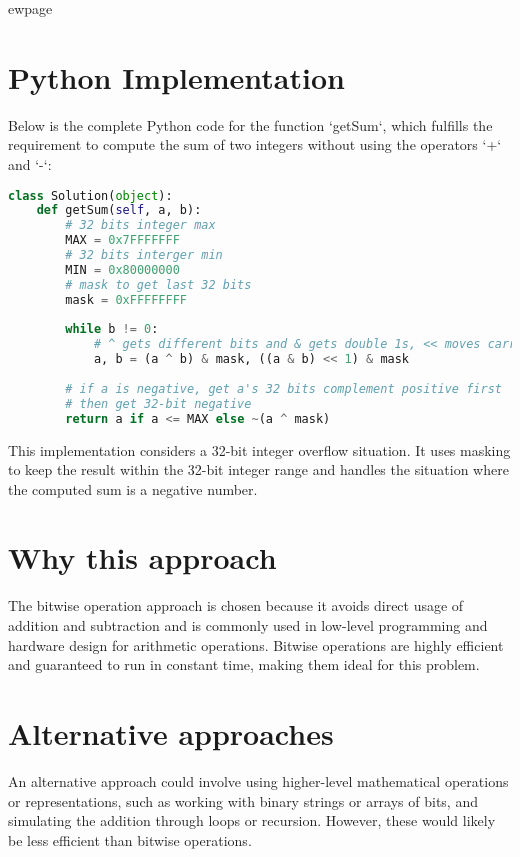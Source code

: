 ewpage %
\section*{Python Implementation}
Below is the complete Python code for the function `getSum`, which fulfills the requirement to compute the sum of two integers without using the operators `+` and `-`:

\begin{fullwidth}
\begin{lstlisting}[language=Python]
class Solution(object):
    def getSum(self, a, b):
        # 32 bits integer max
        MAX = 0x7FFFFFFF
        # 32 bits interger min 
        MIN = 0x80000000
        # mask to get last 32 bits
        mask = 0xFFFFFFFF
        
        while b != 0:
            # ^ gets different bits and & gets double 1s, << moves carry
            a, b = (a ^ b) & mask, ((a & b) << 1) & mask
            
        # if a is negative, get a's 32 bits complement positive first
        # then get 32-bit negative
        return a if a <= MAX else ~(a ^ mask)
\end{lstlisting}

\end{fullwidth}

This implementation considers a 32-bit integer overflow situation. It uses masking to keep the result within the 32-bit integer range and handles the situation where the computed sum is a negative number.
  
\section*{Why this approach}
The bitwise operation approach is chosen because it avoids direct usage of addition and subtraction and is commonly used in low-level programming and hardware design for arithmetic operations. Bitwise operations are highly efficient and guaranteed to run in constant time, making them ideal for this problem.

\section*{Alternative approaches}
An alternative approach could involve using higher-level mathematical operations or representations, such as working with binary strings or arrays of bits, and simulating the addition through loops or recursion. However, these would likely be less efficient than bitwise operations.

